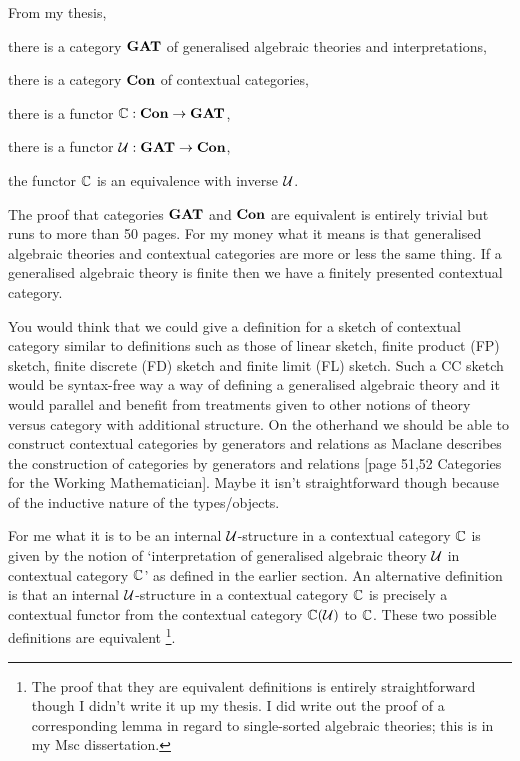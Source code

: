 
\note From my thesis, 
\begin{point}
there is a category $\catGAT$ of generalised algebraic theories and interpretations,
\end{point}
\begin{point}
there is a category $\catCon$ of contextual categories,
\end{point}
\begin{point}
there is a functor $\ccat[C]: \catCon \morph \catGAT$,
\end{point}
\begin{point}
there is a functor $\gat[U]:\catGAT \morph \catCon$,
\end{point}
\begin{point}
the functor $\ccat[C]$ is an equivalence with inverse $\gat[U]$.
\end{point}

\note
The proof that categories $\catGAT$ and $\catCon$ are equivalent  is entirely trivial but runs to more than 50 pages. For my money what it means is that generalised algebraic theories and contextual categories are more or less the same thing. If a generalised algebraic theory is finite then we have a finitely presented contextual category. 

\note
You would think that we could give a definition for a sketch of contextual category 
similar to  definitions such as those of linear sketch, finite product (FP) sketch, finite discrete (FD) sketch and finite limit (FL) sketch. Such a CC sketch would be syntax-free way a way of defining a generalised algebraic theory and it would parallel and benefit from treatments given to other notions of theory versus category with additional structure. 
On the otherhand we should be able to construct contextual categories by generators and  
relations as Maclane describes the construction of categories by generators and relations
[page 51,52 Categories for the Working Mathematician]. Maybe it isn't  straightforward  though because of the inductive nature of the types/objects. 

\note For me what it is to be an internal $\gat[U]$-structure in a contextual category $\ccat[C]$ is given by the notion of `interpretation of  generalised algebraic theory $\gat[U]$ in  contextual category $\ccat[C]$'
as defined in the earlier section. 
An alternative definition is that an internal $\gat[U]$-structure in a contextual category $\ccat[C]$ is precisely a contextual functor from the contextual category $\CofU$ to $\ccat[C]$. These two possible definitions are equivalent
\footnote{The proof that they are equivalent definitions is entirely straightforward though I didn't write it up my thesis. I did write out the proof of a  corresponding lemma in regard to single-sorted algebraic theories; this is in my Msc dissertation.}.

